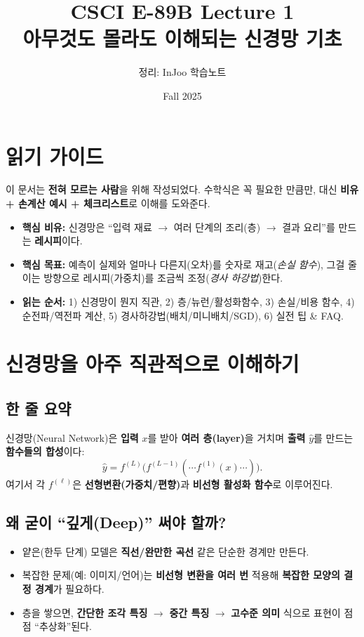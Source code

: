 \documentclass[12pt]{article}
\title{CSCI E-89B Lecture 1 \\ \large 아무것도 몰라도 이해되는 신경망 기초}
\author{정리: InJoo 학습노트}
\date{Fall 2025}
\begin{document}
\maketitle

\section*{읽기 가이드}
이 문서는 \textbf{전혀 모르는 사람}을 위해 작성되었다.
수학식은 꼭 필요한 만큼만, 대신 \textbf{비유 + 손계산 예시 + 체크리스트}로 이해를 도와준다.

\begin{itemize}[left=0pt]
  \item \textbf{핵심 비유:} 신경망은 ``입력 재료 $\rightarrow$ 여러 단계의 조리(층) $\rightarrow$ 결과 요리''를 만드는 \textbf{레시피}이다.
  \item \textbf{핵심 목표:} 예측이 실제와 얼마나 다른지(오차)를 숫자로 재고(\textit{손실 함수}), 그걸 줄이는 방향으로 레시피(가중치)를 조금씩 조정(\textit{경사 하강법})한다.
  \item \textbf{읽는 순서:} 1) 신경망이 뭔지 직관, 2) 층/뉴런/활성화함수, 3) 손실/비용 함수, 4) 순전파/역전파 계산, 5) 경사하강법(배치/미니배치/SGD), 6) 실전 팁 \& FAQ.
\end{itemize}

\section{신경망을 아주 직관적으로 이해하기}
\subsection*{한 줄 요약}
신경망(Neural Network)은 \textbf{입력} $x$를 받아 \textbf{여러 층(layer)}을 거치며 \textbf{출력} $\hat{y}$를 만드는 \textbf{함수들의 합성}이다:
\[
\hat{y} = f^{(L)}\big(f^{(L-1)}(\cdots f^{(1)}(x)\cdots)\big).
\]
여기서 각 $f^{(\ell)}$은 \textbf{선형변환(가중치/편향)}과 \textbf{비선형 활성화 함수}로 이루어진다.

\subsection*{왜 굳이 ``깊게(Deep)'' 써야 할까?}
\begin{itemize}
  \item 얕은(한두 단계) 모델은 \textbf{직선/완만한 곡선} 같은 단순한 경계만 만든다.
  \item 복잡한 문제(예: 이미지/언어)는 \textbf{비선형 변환을 여러 번} 적용해 \textbf{복잡한 모양의 결정 경계}가 필요하다.
  \item 층을 쌓으면, \textbf{간단한 조각 특징} $\rightarrow$ \textbf{중간 특징} $\rightarrow$ \textbf{고수준 의미} 식으로 표현이 점점 ``추상화''된다.
\end{itemize}
\end{document}

